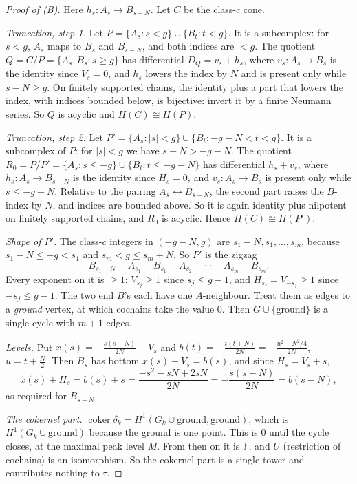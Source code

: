 \documentclass[11pt]{article}
\theoremstyle{definition}
\newcommand{\F}{\mathbb{F}}
\begin{document}
\begin{proof}[Proof of (B)]
Here $h_s\colon A_s\to B_{s-N}$. Let $C$ be the class-$c$ cone.

\emph{Truncation, step 1.} Let $P=\{A_s:s<g\}\cup\{B_t:t<g\}$. It is a subcomplex: for $s<g$, $A_s$ maps to $B_s$ and $B_{s-N}$, and both indices are $<g$. The quotient $Q=C/P=\{A_s,B_s:s\ge g\}$ has differential $D_Q=v_s+h_s$, where $v_s\colon A_s\to B_s$ is the identity since $V_s=0$, and $h_s$ lowers the index by $N$ and is present only while $s-N\ge g$. On finitely supported chains, the identity plus a part that lowers the index, with indices bounded below, is bijective: invert it by a finite Neumann series. So $Q$ is acyclic and $H(C)\cong H(P)$.

\emph{Truncation, step 2.} Let $P'=\{A_s:|s|<g\}\cup\{B_t:-g-N<t<g\}$. It is a subcomplex of $P$: for $|s|<g$ we have $s-N>-g-N$. The quotient $R_0=P/P'=\{A_s:s\le-g\}\cup\{B_t:t\le-g-N\}$ has differential $h_s+v_s$, where $h_s\colon A_s\to B_{s-N}$ is the identity since $H_s=0$, and $v_s\colon A_s\to B_s$ is present only while $s\le-g-N$. Relative to the pairing $A_s\leftrightarrow B_{s-N}$, the second part raises the $B$-index by $N$, and indices are bounded above. So it is again identity plus nilpotent on finitely supported chains, and $R_0$ is acyclic. Hence $H(C)\cong H(P')$.

\emph{Shape of $P'$.} The class-$c$ integers in $(-g-N,g)$ are $s_1-N,s_1,\dots,s_m$, because $s_1-N\le-g<s_1$ and $s_m<g\le s_m+N$. So $P'$ is the zigzag
\[
B_{s_1-N}-A_{s_1}-B_{s_1}-A_{s_2}-\cdots-A_{s_m}-B_{s_m}.
\]
Every exponent on it is $\ge1$: $V_{s_j}\ge1$ since $s_j\le g-1$, and $H_{s_j}=V_{-s_j}\ge1$ since $-s_j\le g-1$. The two end $B$'s each have one $A$-neighbour. Treat them as edges to a \emph{ground} vertex, at which cochains take the value $0$. Then $G\cup\{\text{ground}\}$ is a single cycle with $m+1$ edges.

\emph{Levels.} Put $x(s)=-\frac{s(s+N)}{2N}-V_s$ and $b(t)=-\frac{t(t+N)}{2N}=-\frac{u^2-N^2/4}{2N}$, $u=t+\frac N2$. Then $B_s$ has bottom $x(s)+V_s=b(s)$, and since $H_s=V_s+s$,
\[
x(s)+H_s=b(s)+s=\frac{-s^2-sN+2sN}{2N}=-\frac{s(s-N)}{2N}=b(s-N),
\]
as required for $B_{s-N}$.

\emph{The cokernel part.} $\operatorname{coker}\delta_k=H^1(G_k\cup\text{ground},\text{ground})$, which is $H^1(G_k\cup\text{ground})$ because the ground is one point. This is $0$ until the cycle closes, at the maximal peak level $M$. From then on it is $\F$, and $U$ (restriction of cochains) is an isomorphism. So the cokernel part is a single tower and contributes nothing to $\tau$.


\end{proof}
\end{document}
